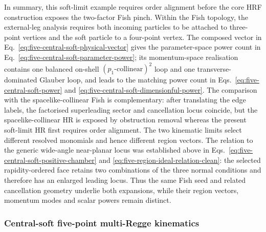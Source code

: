 \documentclass[a4paper,11pt]{article}
\begin{document}
In summary, this soft-limit example requires order alignment before the core
HRF construction exposes the two-factor Fish pinch.  Within the Fish
topology, the external-leg analysis requires both incoming particles to be
attached to three-point vertices and the soft particle to a four-point
vertex.  The composed vector in
Eq.~\eqref{eq:five-central-soft-physical-vector} gives the parameter-space
power count in Eq.~\eqref{eq:five-central-soft-parameter-power}; its
momentum-space realisation contains one balanced on-shell
\((p_1\text{-collinear})^2\) loop and one transverse-dominated Glauber loop,
and leads to the matching power count in
Eqs.~\eqref{eq:five-central-soft-power} and
\eqref{eq:five-central-soft-dimensionful-power}.  The comparison with the
spacelike-collinear Fish is complementary: after translating the edge
labels, the factorised superleading sector and cancellation locus coincide,
but the spacelike-collinear HR is exposed by obstruction removal whereas the
present soft-limit HR first requires order alignment.  The two kinematic
limits select different resolved monomials and hence different region
vectors.  The relation to the generic wide-angle near-planar locus was
established above in
Eqs.~\eqref{eq:five-central-soft-positive-chamber} and
\eqref{eq:five-region-ideal-relation-clean}: the selected rapidity-ordered
face retains two combinations of the three normal conditions and therefore
has an enlarged leading locus.  Thus the same Fish seed and related
cancellation geometry underlie both expansions, while their region vectors,
momentum modes and scalar powers remain distinct.

\iffalse
\subsubsection{Central-soft five-point multi-Regge kinematics}
\label{sec:five-point-central-soft-mrk}
\end{document}
